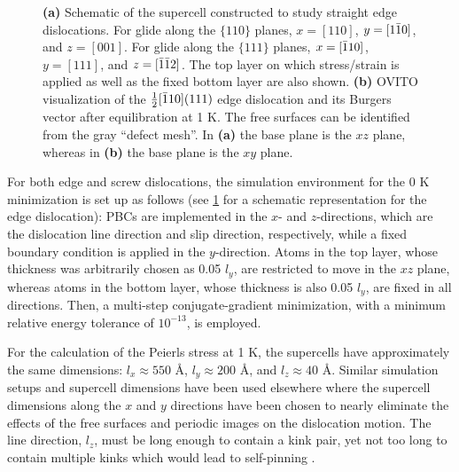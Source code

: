 \documentclass[applsci,article,submit,pdftex,moreauthors]{Definitions/mdpi}
\newcommand{\?}{\stackrel{?}{=}}
\begin{document}
\begin{figure}[h!]
\centering
{}
\hfill
{}

\caption{\textbf{(a)} Schematic of the supercell constructed to study straight edge dislocations. For glide along the $\{ 110 \}$ planes, $x = [110]$, $y = [ 1 \Bar{1} 0 ]$, and $z = [001]$. For glide along the $\{ 111 \}$ planes, $x= [ \Bar{1} 1 0 ]$, $y = [111]$, and $z = [ \Bar{1} \Bar{1} 2 ]$. The top layer on which stress/strain is applied as well as the fixed bottom layer are also shown. \textbf{(b)} OVITO visualization of the $\frac{1}{2} [\Bar{1}10] (111)$ edge dislocation and its Burgers vector after equilibration at 1 K. The free surfaces can be identified from the gray ``defect mesh''. In \textbf{(a)} the base plane is the $xz$ plane, whereas in \textbf{(b)} the base plane is the $xy$ plane.}
\label{Fig:DislocStructure}
\end{figure}

For both edge and screw dislocations, the simulation environment for the 0 K minimization is set up as follows (see \cref{Fig:DislocStructure} for a schematic representation for the edge dislocation): PBCs are implemented in the $x$- and $z$-directions, which are the dislocation line direction and slip direction, respectively, while a fixed boundary condition is applied in the $y$-direction. Atoms in the top layer, whose thickness was arbitrarily chosen as 0.05 $l_y$, are restricted to move in the $xz$ plane, whereas atoms in the bottom layer, whose thickness is also 0.05 $l_y$, are fixed in all directions. Then, a multi-step conjugate-gradient minimization, with a minimum relative energy tolerance of $10^{-13}$, is employed.

For the calculation of the Peierls stress at 1 K, the supercells have approximately the same dimensions: $l_x \approx 550$ \AA, $l_y \approx 200$ \AA, and $l_z \approx 40$ \AA. Similar simulation setups and supercell dimensions have been used elsewhere \cite{Osetsky2003, Olmsted2005, Cho2017, Dang2019, Kaloni2023} where the supercell dimensions along the $x$ and $y$ directions have been chosen to nearly eliminate the effects of the free surfaces and periodic images on the dislocation motion. The line direction, $l_z$, must be long enough to contain a kink pair, yet not too long to contain multiple kinks which would lead to self-pinning \cite{Gilbert2011}.
\end{document}
